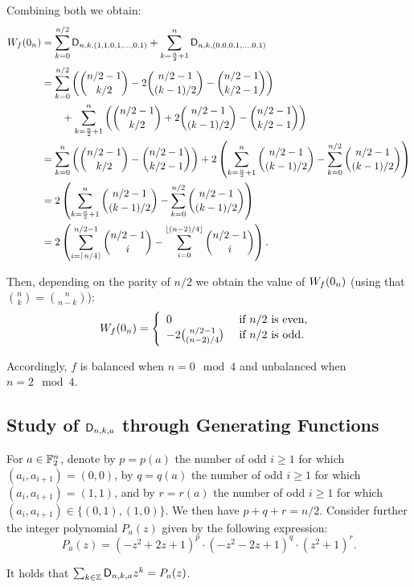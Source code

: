 \documentclass[11pt]{llncs}
\begin{document}
Combining both we obtain:
\begin{align*}
W_{f}(0_n)&=\sum_{k=0}^{n/2}\mathsf{D}_{n,k,(1,1,0,1,\ldots,0,1)}+ \sum_{k=\frac{n}{2}+1}^{n}\mathsf{D}_{n,k,(0,0,0,1,\ldots,0,1)}\\
&=\sum_{k=0}^{n/2} \left(\binom{n/2-1}{k/2} -2 \binom{n/2-1}{(k-1)/2} - \binom{n/2-1}{k/2-1} \right)\\
&\qquad+ \sum_{k=\frac{n}{2}+1}^{n}   \left(  \binom{n/2-1}{k/2} +2 \binom{n/2-1}{(k-1)/2} - \binom{n/2-1}{k/2-1} \right)\\
&=\sum_{k=0}^{n}\left( \binom{n/2-1}{k/2} - \binom{n/2-1}{k/2-1}\right) 
+ 2 \left( \sum_{k=\frac{n}{2}+1}^{n} \binom{n/2-1}{(k-1)/2} - \sum_{k=0}^{n/2} \binom{n/2-1}{(k-1)/2}\right)\\
&=2 \left( \sum_{k=\frac{n}{2}+1}^{n} \binom{n/2-1}{(k-1)/2} - \sum_{k=0}^{n/2} \binom{n/2-1}{(k-1)/2}\right)\\
&=2 \left( \sum_{i=\lceil n/4 \rceil}^{n/2-1} \binom {n/2-1}{i} - \sum_{i=0}^{\lfloor(n-2)/4 \rfloor} \binom{n/2-1}{i}\right).\\
\end{align*}

Then, depending on the parity of $n/2$ we obtain the value of $W_{f}(0_n)$ (using that $\binom{n}{k}=\binom{n}{n-k}$):
	\[W_{f}(0_n)= \left \{
\begin{array}{l l}
0 & \text{ if } n/2 \text{ is even, } \\
-2 \binom{n/2-1}{(n-2)/4} & \text{ if }  n/2 \text{ is odd.}
\end{array}\right.\]

Accordingly, $f$ is balanced when $n=0\mod 4$ and unbalanced when $n=2 \mod 4$.


\subsection{Study of $\mathsf{D}_{n,k,a}$ through Generating Functions}
For $a\in\mathbb{F}_2^n$, denote by $p=p(a)$ the number of odd $i\geq 1$ for which $(a_i,a_{i+1})=(0,0)$, by $q=q(a)$ the number of odd $i\geq 1$ for which $(a_i,a_{i+1})=(1,1)$, and by $r=r(a)$ the number of odd $i\geq 1$ for which $(a_i,a_{i+1})\in\{(0,1),(1,0)\}$. We then have $p+q+r=n/2$. Consider further the integer polynomial $P_a(z)$ given by the following expression:
\[
P_a(z)=(-z^2+2z+1)^{p}\cdot(-z^2-2z+1)^{q}\cdot(z^2+1)^{r}.
\]

\begin{Prop}\label{prop:generating_fct}
	It holds that $\sum_{k\in\mathbb{Z}}\mathsf{D}_{n,k,a} z^k= P_a(z)$.
\end{Prop}
\end{document}
